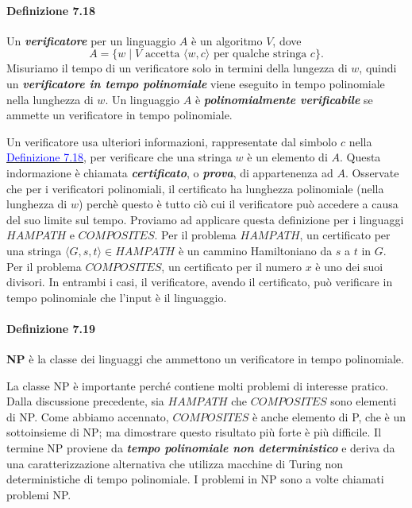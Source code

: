 \documentclass{article}
\begin{document}
\paragraph{Definizione 7.18}
\label{definizione-7.18}
\vspace{1em}
\text{}
\newline
\begin{tcolorbox}[colback=yellow!10!white, colframe=yellow!50!black, title=Definizione 7.18]
    Un \textit{\textbf{verificatore}} per un linguaggio $A$ è un algoritmo $V$, dove
    $$
    A = \{ w \mid V \text{ accetta } \langle w, c \rangle \text{ per qualche stringa } c \}.
    $$
    Misuriamo il tempo di un verificatore solo in termini della lungezza di $w$, quindi un \textit{\textbf{verificatore in tempo polinomiale}} viene eseguito in tempo polinomiale nella lunghezza di $w$.
    Un linguaggio $A$ è \textit{\textbf{polinomialmente verificabile}} se ammette un verificatore in tempo polinomiale.
\end{tcolorbox}
Un verificatore usa ulteriori informazioni, rappresentate dal simbolo $c$ nella \hyperref[definizione-7.18]{\textcolor{blue}{Definizione 7.18}}, per verificare che una stringa $w$ è un elemento di $A$.
Questa indormazione è chiamata \textit{\textbf{certificato}}, o \textit{\textbf{prova}}, di appartenenza ad $A$.
Osservate che per i verificatori polinomiali, il certificato ha lunghezza polinomiale (nella lunghezza di $w$) perchè questo è tutto ciò cui il verificatore può accedere a causa del suo limite sul tempo.
Proviamo ad applicare questa definizione per i linguaggi $HAMPATH$ e $COMPOSITES$.
Per il problema $HAMPATH$, un certificato per una stringa $\langle G, s, t \rangle \in HAMPATH$ è un cammino Hamiltoniano da $s$ a $t$ in $G$.
Per il problema $COMPOSITES$, un certificato per il numero $x$ è uno dei suoi divisori.
In entrambi i casi, il verificatore, avendo il certificato, può verificare in tempo polinomiale che l'input è il linguaggio.
\paragraph{Definizione 7.19}
\label{definizione-7.19}
\vspace{1em}
\text{}
\newline
\begin{tcolorbox}[colback=yellow!10!white, colframe=yellow!50!black, title=Definizione 7.19]
    \textbf{NP} è la classe dei linguaggi che ammettono un verificatore in tempo polinomiale.
\end{tcolorbox}
La classe NP è importante perché contiene molti problemi di interesse pratico. 
Dalla discussione precedente, sia $HAMPATH$ che $COMPOSITES$ sono elementi di NP. 
Come abbiamo accennato, $COMPOSITES$ è anche elemento di P, che è un sottoinsieme di NP; 
ma dimostrare questo risultato più forte è più difficile.
Il termine NP proviene da \textit{\textbf{tempo polinomiale non deterministico}} e deriva da una caratterizzazione alternativa che utilizza macchine di Turing non deterministiche di tempo polinomiale.
I problemi in NP sono a volte chiamati problemi NP.
\end{document}
